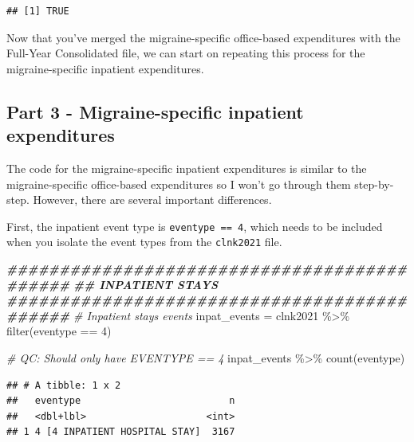 \documentclass[
]{book}
\newenvironment{Shaded}{\begin{snugshade}}{\end{snugshade}}
\newcommand{\CommentTok}[1]{\textcolor[rgb]{0.56,0.35,0.01}{\textit{#1}}}
\newcommand{\DecValTok}[1]{\textcolor[rgb]{0.00,0.00,0.81}{#1}}
\newcommand{\DocumentationTok}[1]{\textcolor[rgb]{0.56,0.35,0.01}{\textbf{\textit{#1}}}}
\newcommand{\FunctionTok}[1]{\textcolor[rgb]{0.00,0.00,0.00}{#1}}
\newcommand{\NormalTok}[1]{#1}
\newcommand{\OtherTok}[1]{\textcolor[rgb]{0.56,0.35,0.01}{#1}}
\newcommand{\SpecialCharTok}[1]{\textcolor[rgb]{0.00,0.00,0.00}{#1}}
\begin{document}
\begin{verbatim}
## [1] TRUE
\end{verbatim}

Now that you've merged the migraine-specific office-based expenditures with the Full-Year Consolidated file, we can start on repeating this process for the migraine-specific inpatient expenditures.

\hypertarget{part-3---migraine-specific-inpatient-expenditures}{%
\subsection{Part 3 - Migraine-specific inpatient expenditures}\label{part-3---migraine-specific-inpatient-expenditures}}

The code for the migraine-specific inpatient expenditures is similar to the migraine-specific office-based expenditures so I won't go through them step-by-step. However, there are several important differences.

First, the inpatient event type is \texttt{eventype\ ==\ 4}, which needs to be included when you isolate the event types from the \texttt{clnk2021} file.

\begin{Shaded}
\begin{Highlighting}[]
\DocumentationTok{\#\#\#\#\#\#\#\#\#\#\#\#\#\#\#\#\#\#\#\#\#\#\#\#\#\#\#\#\#\#\#\#\#\#\#\#\#\#\#\#\#\#\#\#}
\DocumentationTok{\#\# INPATIENT STAYS}
\DocumentationTok{\#\#\#\#\#\#\#\#\#\#\#\#\#\#\#\#\#\#\#\#\#\#\#\#\#\#\#\#\#\#\#\#\#\#\#\#\#\#\#\#\#\#\#\#}
\CommentTok{\# Inpatient stays events}
\NormalTok{inpat\_events }\OtherTok{=}\NormalTok{ clnk2021 }\SpecialCharTok{\%\textgreater{}\%}
  \FunctionTok{filter}\NormalTok{(eventype }\SpecialCharTok{==} \DecValTok{4}\NormalTok{)}

\CommentTok{\# QC: Should only have EVENTYPE == 4}
\NormalTok{inpat\_events }\SpecialCharTok{\%\textgreater{}\%}
  \FunctionTok{count}\NormalTok{(eventype)}
\end{Highlighting}
\end{Shaded}

\begin{verbatim}
## # A tibble: 1 x 2
##   eventype                          n
##   <dbl+lbl>                     <int>
## 1 4 [4 INPATIENT HOSPITAL STAY]  3167
\end{verbatim}
\end{document}
